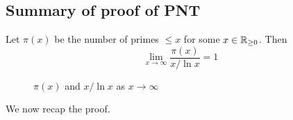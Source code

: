 \documentclass[12pt]{article}
\begin{document}
\subsection{Summary of proof of PNT}
\begin{theorem}
    Let $\pi(x)$ be the number of primes $\leq x$ for some $x\in \mathbb{R}_{\geq 0}$. Then \[\lim_{x\to \infty}\frac{\pi(x)}{x/\ln x}=1\]
\end{theorem}
\begin{figure}[htbp]
    \centering
    
    
    
    \caption{$\pi(x)$ and $x/\ln x$ as $x\to \infty$}
    \label{fig:pnt}
\end{figure}
We now recap the proof.
\end{document}
